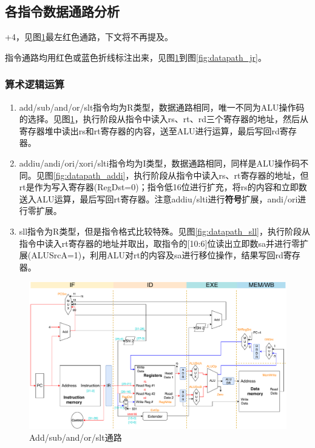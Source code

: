 
\subsection{各指令数据通路分析}
+4，见图\ref{fig:datapath_add}最左红色通路，下文将不再提及。
\par 指令通路均用红色或蓝色折线标注出来，见图\ref{fig:datapath_add}到图\ref{fig:datapath_jr}。

\subsubsection{算术逻辑运算}
\begin{enumerate}
	\item add/sub/and/or/slt指令均为R类型，数据通路相同，唯一不同为ALU操作码的选择。见图\ref{fig:datapath_add}，执行阶段从指令中读入rs、rt、rd三个寄存器的地址，然后从寄存器堆中读出rs和rt寄存器的内容，送至ALU进行运算，最后写回rd寄存器。
	\item addiu/andi/ori/xori/slti指令均为I类型，数据通路相同，同样是ALU操作码不同。见图\ref{fig:datapath_addi}，执行阶段从指令中读入rs、rt寄存器的地址，但rt是作为写入寄存器(RegDst=0)；指令低16位进行扩充，将rs的内容和立即数送入ALU运算，最后写回rt寄存器。注意addiu/slti进行\textbf{符号}扩展，andi/ori进行零扩展。
	\item sll指令为R类型，但是指令格式比较特殊。见图\ref{fig:datapath_sll}，执行阶段从指令中读入rt寄存器的地址并取出，取指令的[10:6]位读出立即数sa并进行零扩展(ALUSrcA=1)，利用ALU对rt的内容及sa进行移位操作，结果写回rd寄存器。
\end{enumerate}
\begin{figure}[H]
\centering
\includegraphics[width=\linewidth]{fig/Datapath-add-sub.pdf}
\caption{Add/sub/and/or/slt通路}
\label{fig:datapath_add}
\end{figure}
